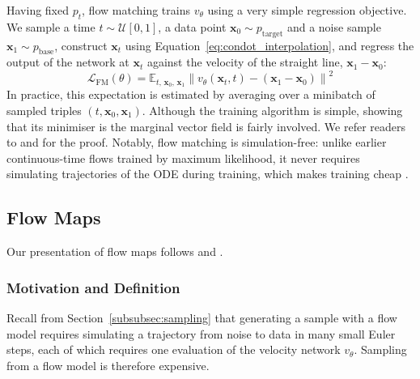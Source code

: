 \documentclass[12pt,a4paper]{report}
\begin{document}
Having fixed $p_t$, flow matching trains $v_{\theta}$ using a very simple regression objective. We sample a time $t\sim\mathcal{U}[0,1]$, a data point $\mathbf{x}_0\sim p_{\mathrm{target}}$ and a noise sample $\mathbf{x}_1\sim p_{\mathrm{base}}$, construct $\mathbf{x}_t$ using Equation~\ref{eq:condot_interpolation}, and regress the output of the network at $\mathbf{x}_t$ against the velocity of the straight line, $\mathbf{x}_1-\mathbf{x}_0$:
\begin{equation}
\mathcal{L}_{\mathrm{FM}}(\theta)
=
\mathbb{E}_{t,\,\mathbf{x}_0,\,\mathbf{x}_1}
\left\|
v_{\theta}(\mathbf{x}_t,t)
-
(\mathbf{x}_1-\mathbf{x}_0)
\right\|^2
\label{eq:flow_matching_loss}
\end{equation}
In practice, this expectation is estimated by averaging over a minibatch of sampled triples $(t,\mathbf{x}_0,\mathbf{x}_1)$. Although the training algorithm is simple, showing that its minimiser is the marginal vector field is fairly involved. We refer readers to \textcite{mit_FM} and \textcite{lipman_FM} for the proof. 
Notably, flow matching is simulation-free: unlike earlier continuous-time flows trained by maximum likelihood, it never requires simulating trajectories of the ODE during training, which makes training cheap \parencite{lipman_FM}.

\subsection{Flow Maps}
\label{subsec:flow_maps}
Our presentation of flow maps follows \textcite{sander_MF} and \textcite{boffi2025flowmapmatchingstochastic}.

\subsubsection{Motivation and Definition}
\label{subsubsec:flow_map_definition}
Recall from Section~\ref{subsubsec:sampling} that generating a sample with a flow model requires simulating a trajectory from noise to data in many small Euler steps, each of which requires one evaluation of the velocity network $v_\theta$. Sampling from a flow model is therefore expensive.
\end{document}
